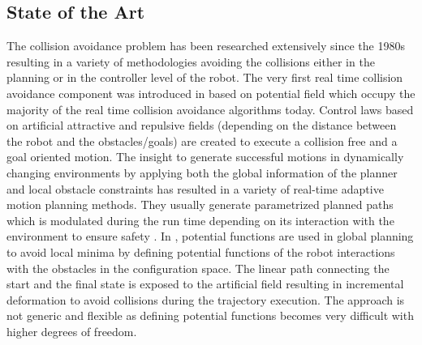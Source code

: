 \subsection{State of the Art}
The collision avoidance problem has been researched extensively since the 1980s resulting in a variety of methodologies avoiding the collisions either in the planning or in the controller level of the robot. The very first real time collision avoidance component was introduced in \cite{khatib1986real} based on potential field which occupy the majority of the real time collision avoidance algorithms today. Control laws based on artificial attractive and repulsive fields (depending on the distance between the robot and the obstacles/goals) are created to execute a collision free and a goal oriented motion. The insight to generate successful motions in dynamically changing environments by applying both the global information of the  planner and local obstacle constraints has resulted in a variety of real-time adaptive motion planning methods. They usually generate parametrized planned paths which is modulated during the run time depending on its interaction with the environment to ensure safety \cite{lindemann2005current,brock2008manipulation}. In \cite{warren1989global}, potential functions are used in global planning to avoid local minima by defining potential functions of the robot interactions with the obstacles in the configuration space. The linear path connecting the start and the final state is exposed to the artificial field resulting in incremental deformation to avoid collisions during the trajectory execution. The approach is not generic and flexible as defining potential functions becomes very difficult with higher degrees of freedom. 

